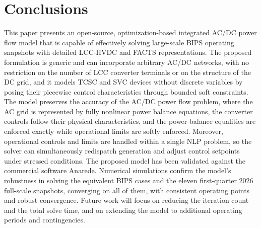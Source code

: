 \documentclass[letterpaper,journal]{IEEEtran}
\begin{document}
\section{Conclusions}

This paper presents an open-source, optimization-based integrated AC/DC power flow model that is capable of effectively solving
large-scale BIPS operating snapshots with detailed LCC-HVDC and FACTS representations. The proposed formulation is generic and can
incorporate arbitrary AC/DC networks, with no restriction on the number of LCC converter terminals or on the structure of the DC
grid, and it models TCSC and SVC devices without discrete variables by posing their piecewise control characteristics through
bounded soft constraints. The model preserves the accuracy of the AC/DC power flow problem, where the AC grid is represented by fully
nonlinear power balance equations, the converter controls follow their physical characteristics, and the power-balance equalities
are enforced exactly while operational limits are softly enforced. Moreover, operational controls and limits are handled within a
single NLP problem, so the solver can simultaneously redispatch generation and adjust control setpoints under stressed conditions.
The proposed model has been validated against the commercial software Anarede. Numerical simulations confirm the model's robustness
in solving the equivalent BIPS cases and the eleven first-quarter 2026 full-scale snapshots, converging on
all of them, with consistent operating points and robust convergence. Future work will focus on
reducing the iteration count and the total solve time, and on extending the model to additional operating periods and contingencies.
\end{document}
